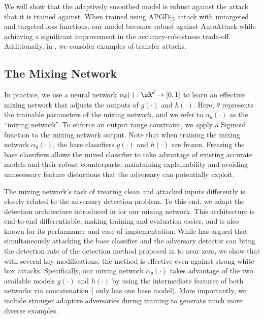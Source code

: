 \documentclass[11pt, letterpaper]{article}
\theoremstyle{plain}
\theoremstyle{definition}
\begin{document}
We will show that the adaptively smoothed model is robust against the attack that it is trained against. When trained using APGD$_{75}$ attack with untargeted and targeted loss functions, our model becomes robust against AutoAttack while achieving a significant improvement in the accuracy-robustness trade-off. Additionally, in , we consider examples of transfer attacks.


\subsection{The Mixing Network} \label{sec:mixing_network}

In practice, we use a neural network $\alpha_\theta (\cdot) : \sR^d \to [0, 1]$ to learn an effective mixing network that adjusts the outputs of $g (\cdot)$ and $h (\cdot)$. Here, $\theta$ represents the trainable parameters of the mixing network, and we refer to $\alpha_\theta (\cdot)$ as the ``mixing network''. To enforce an output range constraint, we apply a Sigmoid function to the mixing network output. Note that when training the mixing network $\alpha_\theta (\cdot)$, the base classifiers $g (\cdot)$ and $h (\cdot)$ are frozen. Freezing the base classifiers allows the mixed classifier to take advantage of existing accurate models and their robust counterparts, maintaining explainability and avoiding unnecessary feature distortions that the adversary can potentially exploit.

The mixing network's task of treating clean and attacked inputs differently is closely related to the adversary detection problem. To this end, we adapt the detection architecture introduced in \citep{Metzen17} for our mixing network. This architecture is end-to-end differentiable, making training and evaluation easier, and is also known for its performance and ease of implementation. While \citep{Carlini17b} has argued that simultaneously attacking the base classifier and the adversary detector can bring the detection rate of the detection method proposed in \citep{Metzen17} to near zero, we show that with several key modifications, the method is effective even against strong white-box attacks. Specifically, our mixing network $\alpha_\theta (\cdot)$ takes advantage of the two available models $g (\cdot)$ and $h (\cdot)$ by using the intermediate features of both networks via concatenation (\citep{Metzen17} only has one base model). More importantly, we include stronger adaptive adversaries during training to generate much more diverse examples.
\end{document}
